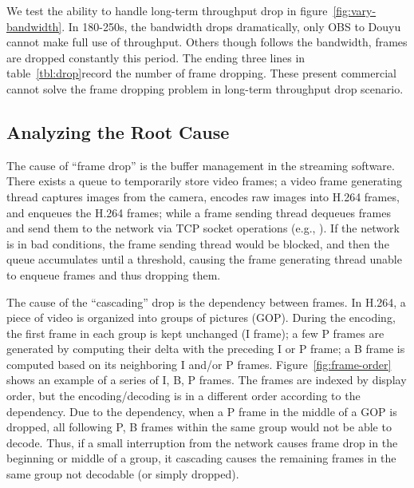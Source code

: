 We test the ability to handle long-term throughput drop in figure~\ref{fig:vary-bandwidth}. In 180-250s, the bandwidth drops dramatically, only OBS to Douyu cannot make full use of throughput. Others though follows the bandwidth, frames are dropped constantly this period. The ending three lines in table~\ref{tbl:drop}record the number of frame dropping. These present commercial cannot solve the frame dropping problem in long-term throughput drop scenario.

\subsection{Analyzing the Root Cause}


The cause of ``frame drop'' is the buffer management in the streaming software. There exists a queue to temporarily store video frames; a video frame generating thread captures images from the camera, encodes raw images into H.264 frames, and enqueues the H.264 frames; while a frame sending thread dequeues frames and send them to the network via TCP socket operations (e.g., \mywrite).
If the network is in bad conditions, the frame sending thread would be blocked, and then the queue accumulates until a threshold, causing the frame generating thread unable to enqueue frames and thus dropping them.



The cause of the ``cascading'' drop is the dependency between frames. In H.264, a piece of video is organized into groups of pictures (GOP). During the encoding, the first frame in each group is kept unchanged (I frame); a few P frames are generated by computing their delta with the preceding I or P frame; a B frame is computed based on its neighboring I and/or P frames. Figure~\ref{fig:frame-order} shows an example of a series of I, B, P frames. The frames are indexed by display order, but the encoding/decoding is in a different order according to the dependency. Due to the dependency, when a P frame in the middle of a GOP is dropped, all following P, B frames within the same group would not be able to decode. Thus, if a small interruption from the network causes frame drop in the beginning or middle of a group, it cascading causes the remaining frames in the same group not decodable (or simply dropped).

